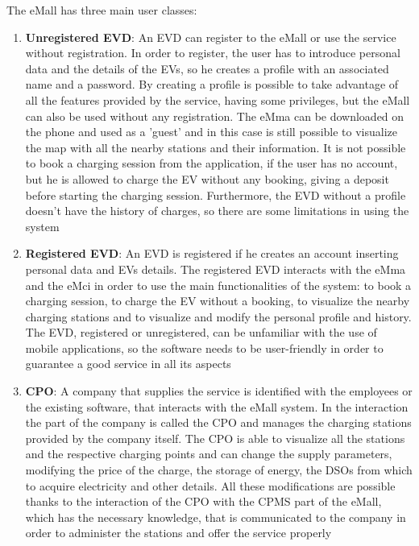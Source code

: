 The eMall has three main user classes:
\begin{enumerate}
    \item \textbf{Unregistered EVD}: An EVD can register to the eMall or use the service without registration. In order to register, the user has to introduce personal data and the details of the EVs, so he creates a profile with an associated name and a password. By creating a profile is possible to take advantage of all the features provided by the service, having some privileges, but the eMall can also be used without any registration. The eMma can be downloaded on the phone and used as a 'guest' and in this case is still possible to visualize the map with all the nearby stations and their information. It is not possible to book a charging session from the application, if the user has no account, but he is allowed to charge the EV without any booking, giving a deposit before starting the charging session. Furthermore, the EVD without a profile doesn't have the history of charges, so there are some limitations in using the system
    \item \textbf{Registered EVD}: An EVD is registered if he creates an account inserting personal data and EVs details. The registered EVD interacts with the eMma and the eMci in order to use the main functionalities of the system: to book a charging session, to charge the EV without a booking, to visualize the nearby charging stations and to visualize and modify the personal profile and history. The EVD, registered or unregistered, can be unfamiliar with the use of mobile applications, so the software needs to be user-friendly in order to guarantee a good service in all its aspects 
    \item \textbf{CPO}: A company that supplies the service is identified with the employees or the existing software, that interacts with the eMall system. In the interaction the part of the company is called the CPO and manages the charging stations provided by the company itself. The CPO is able to visualize all the stations and the respective charging points and can change the supply parameters, modifying the price of the charge, the storage of energy, the DSOs from which to acquire electricity and other details. All these modifications are possible thanks to the interaction of the CPO with the CPMS part of the eMall, which has the necessary knowledge, that is communicated to the company in order to administer the stations and offer the service properly 
\end{enumerate}
